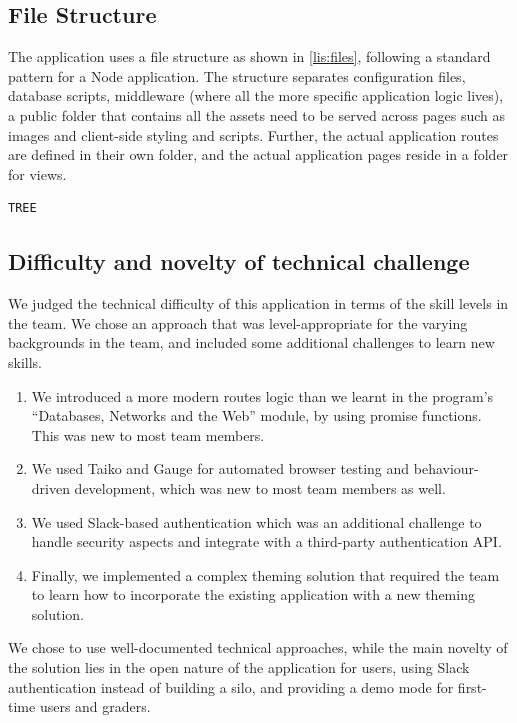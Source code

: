 \subsection{File Structure}\label{sec:files}
The application uses a file structure as shown in \cref{lis:files}, following a standard pattern for a Node application. The structure separates configuration files, database scripts, middleware (where all the more specific application logic lives), a public folder that contains all the assets need to be served across pages such as images and client-side styling and scripts. Further, the actual application routes are defined in their own folder, and the actual application pages reside in a folder for views.

\begin{listing}[H]
	\caption{}
	\label{lis:files}
	\begin{verbatim}
TREE
	\end{verbatim}
\end{listing}

\subsection{Difficulty and novelty of technical challenge}\label{sec:techdiff}
We judged the technical difficulty of this application in terms of the skill levels in the team. We chose an approach that was level-appropriate for the varying backgrounds in the team, and included some additional challenges to learn new skills.

\begin{enumerate}
	\item We introduced a more modern routes logic than we learnt in the program's ``Databases, Networks and the Web'' module, by using promise functions. This was new to most team members.
	\item We used Taiko and Gauge for automated browser testing and behaviour-driven development, which was new to most team members as well.
	\item We used Slack-based authentication which was an additional challenge to handle security aspects and integrate with a third-party authentication API.
	\item Finally, we implemented a complex theming solution that required the team to learn how to incorporate the existing application with a new theming solution.
\end{enumerate}

We chose to use well-documented technical approaches, while the main novelty of the solution lies in the open nature of the application for users, using Slack authentication instead of building a silo, and providing a demo mode for first-time users and graders.


